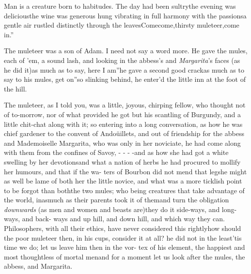 \documentclass{article}
\begin{document}
Man is a creature born to habitudes. The day had been
sultry\tsk the evening was delicious\tsk the wine was
generous\tsk\break{}
hung vibrating in full harmony with the
passions\tsk a gentle air rustled distinctly through the
leaves\tsk \lqq Come\tsk come,\break\lqq thirsty
muleteer,\tsk come in.”

\tsh The muleteer was a son of Adam.
I need not say a word more. He gave
the mules, each of ’em, a sound lash,\break
and looking in the abbess’s and \textit{Marga\-rita}’s 
faces (as he did it)\tsk as much as to
say, \lqq here I am”\tsk he gave a second good\break
crack\tsk as much as to say to his mules,
\lqq get on”\tsh so slinking behind,
he enter’d the little inn at the foot of the hill.

The muleteer, as I told you, was a\break
little, joyous, chirping fellow, who 
thought not of to-morrow, nor of what 
provided he got but his
scantling of Burgundy, and a little chit-chat along with it; so
entering into a long conversation, as how he was chief gardener
to the convent of Andoüillets, \etc\etc and out of friendship
for the abbess and Mademoiselle Margarita, who was only in her
noviciate, he had come along with them from the confines of
Savoy, \etc - - \etc- -\break and as how she had got a white
swelling by her devotions\tsk and what a nation of herbs he had
procured to mollify her humours, \etc\etc and that if the wa-
ters of Bourbon did not mend that leg\tsk she might as well be
lame of both\tsk \etc
{}
her the little novice, and what was a more ticklish point to be forgot
than both\tsk the two mules; who being creatures that take
advantage of the world, inasmuch as their parents took it of
them\tsk and 
turn the obligation \textit{downwards} (as men and women and beasts
are)\tsk they do it side-ways, and long-ways, and back-\break
ways\tsk
and up hill, and down hill, and which way they can.\tsk
Philosophers, with all their ethics, have never considered this
rightly\tsk how should the poor muleteer then, in his cups,
consider it at all? he did not in the least\tsk ’tis time we do;
let us leave him then in the vor- tex of his element, the happiest
and most thoughtless of mortal men\tsk and for a moment let us
look after the mules, the abbess, and Margarita.
\end{document}
